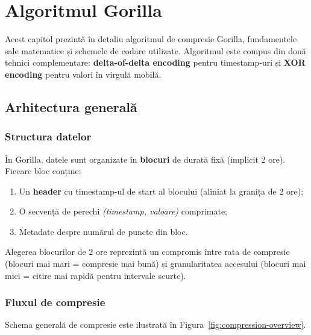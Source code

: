 \chapter{Algoritmul Gorilla}
\label{chap:gorilla}

Acest capitol prezintă în detaliu algoritmul de compresie Gorilla, fundamentele sale matematice și schemele de codare utilizate. Algoritmul este compus din două tehnici complementare: \textbf{delta-of-delta encoding} pentru timestamp-uri și \textbf{XOR encoding} pentru valori în virgulă mobilă.

\section{Arhitectura generală}

\subsection{Structura datelor}

În Gorilla, datele sunt organizate în \textbf{blocuri} de durată fixă (implicit 2 ore). Fiecare bloc conține:

\begin{enumerate}
    \item Un \textbf{header} cu timestamp-ul de start al blocului (aliniat la granița de 2 ore);
    \item O secvență de perechi \textit{(timestamp, valoare)} comprimate;
    \item Metadate despre numărul de puncte din bloc.
\end{enumerate}

Alegerea blocurilor de 2 ore reprezintă un compromis între rata de compresie (blocuri mai mari = compresie mai bună) și granularitatea accesului (blocuri mai mici = citire mai rapidă pentru intervale scurte).

\subsection{Fluxul de compresie}

Schema generală de compresie este ilustrată în Figura~\ref{fig:compression-overview}.

